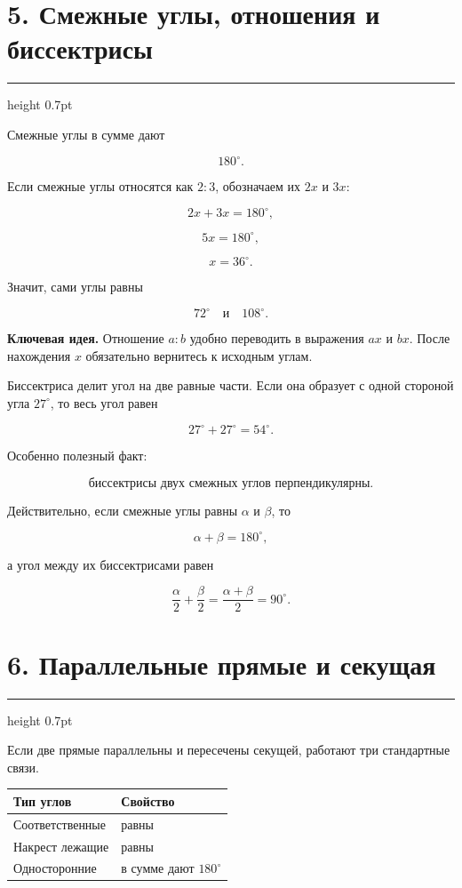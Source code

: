 \documentclass[a4paper,12pt]{article}
\newcommand{\sectionline}{%
    \vspace{-0.15em}
    {\color{accent}\hrule height 0.7pt}
    \vspace{0.55em}
}
\newcommand{\keyidea}[1]{%
    \par\noindent
    {\color{darkaccent}\textbf{Ключевая идея.}} #1\par
}
\newcommand{\formula}[1]{%
    \[
        \boxed{\displaystyle #1}
    \]
}
\begin{document}
\clearpage

\section*{\color{darkaccent}5. Смежные углы, отношения и биссектрисы}
\sectionline

Смежные углы в сумме дают

\formula{180^\circ.}

Если смежные углы относятся как $2:3$, обозначаем их $2x$ и $3x$:

\[
2x+3x=180^\circ,
\]

\[
5x=180^\circ,
\]

\[
x=36^\circ.
\]

Значит, сами углы равны

\[
72^\circ\quad\text{и}\quad108^\circ.
\]

\keyidea{Отношение $a:b$ удобно переводить в выражения $ax$ и $bx$. После
нахождения $x$ обязательно вернитесь к исходным углам.}

Биссектриса делит угол на две равные части. Если она образует с одной стороной
угла $27^\circ$, то весь угол равен

\[
27^\circ+27^\circ=54^\circ.
\]

Особенно полезный факт:

\formula{\text{биссектрисы двух смежных углов перпендикулярны}.}

Действительно, если смежные углы равны $\alpha$ и $\beta$, то

\[
\alpha+\beta=180^\circ,
\]

а угол между их биссектрисами равен

\[
\frac{\alpha}{2}+\frac{\beta}{2}
=
\frac{\alpha+\beta}{2}
=
90^\circ.
\]

\section*{\color{darkaccent}6. Параллельные прямые и секущая}
\sectionline

Если две прямые параллельны и пересечены секущей, работают три стандартные
связи.

\begin{center}
\begin{tabularx}{0.88\linewidth}{@{}X X@{}}
\toprule
\textbf{Тип углов} & \textbf{Свойство} \\
\midrule
Соответственные & равны \\
Накрест лежащие & равны \\
Односторонние & в сумме дают $180^\circ$ \\
\bottomrule
\end{tabularx}
\end{center}
\end{document}
